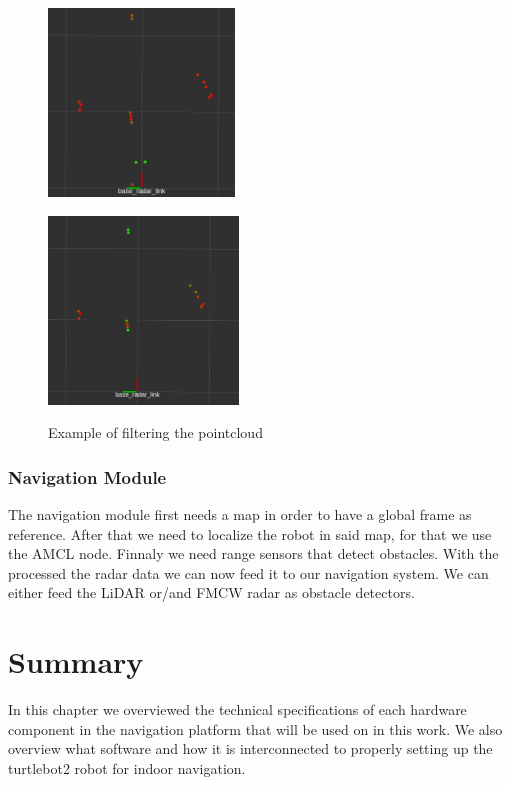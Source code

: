 \begin{figure}[ht!] 
    \begin{minipage}[b]{.49\linewidth}
        \includegraphics[height=5cm,width=\linewidth]{imgs/chapter4/notfilt.png}
        \label{fig:nonfilt}
    \end{minipage}
    \begin{minipage}[b]{.49\linewidth}
        \includegraphics[height=5cm,width=\linewidth]{imgs/chapter4/filt.png}
        \label{fig:filt}
    \end{minipage}
    \caption{Example of filtering the pointcloud}
    \label{fig:filters}
\end{figure}
\subsubsection{Navigation Module}
The navigation module first needs a map in order to have a global frame as reference. After that we need to localize the robot in said map, for that we use the \ac{AMCL} node. Finnaly we need range sensors that detect obstacles.
With the processed the \ac{radar} data we can now feed it to our navigation system. We can either feed the \ac{LiDAR} or/and \ac{FMCW} \ac{radar} as obstacle detectors. 


\section{Summary}
In this chapter we overviewed the technical specifications of each hardware component in the navigation platform that will be used on in this work. We also overview what software and how it is interconnected  to properly setting up the turtlebot2 robot for indoor navigation.


